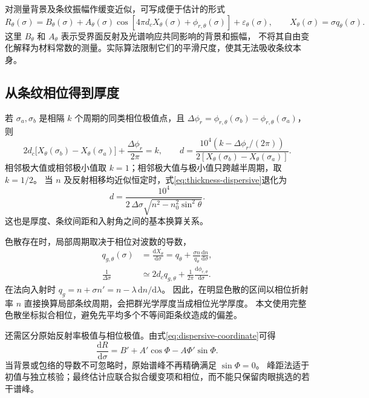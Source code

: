 对测量背景及条纹振幅作缓变近似，可写成便于估计的形式
\begin{equation}
 R_\theta(\sigma)=B_\theta(\sigma)+A_\theta(\sigma)
 \cos\!\left[4\pi d_cX_\theta(\sigma)+\phi_{r,\theta}(\sigma)\right]
 +\varepsilon_\theta(\sigma),\qquad
 X_\theta(\sigma)=\sigma q_\theta(\sigma).
 \label{eq:dispersive-coordinate}
\end{equation}
这里 $B_\theta$ 和 $A_\theta$ 表示受界面反射及光谱响应共同影响的背景和振幅，
不将其自由变化解释为材料常数的测量。实际算法限制它们的平滑尺度，使其无法吸收条纹本身。

\subsection{从条纹相位得到厚度}
若 $\sigma_a,\sigma_b$ 是相隔 $k$ 个周期的同类相位极值点，且
$\Delta\phi_r=\phi_{r,\theta}(\sigma_b)-\phi_{r,\theta}(\sigma_a)$，则
\begin{equation}
 2d_c\big[X_\theta(\sigma_b)-X_\theta(\sigma_a)\big]
 +\frac{\Delta\phi_r}{2\pi}=k,
 \qquad
 d=\frac{10^4\left(k-\Delta\phi_r/(2\pi)\right)}
 {2\left[X_\theta(\sigma_b)-X_\theta(\sigma_a)\right]}.
 \label{eq:thickness-dispersive}
\end{equation}
相邻极大值或相邻极小值取 $k=1$；相邻极大值与极小值只跨越半周期，取 $k=1/2$。
当 $n$ 及反射相移均近似恒定时，式\eqref{eq:thickness-dispersive}退化为
\begin{equation}
 d=\frac{10^4}{2\,\Delta\sigma\sqrt{n^2-n_0^2\sin^2\theta}}.
 \label{eq:thickness-constant-n}
\end{equation}
这也是厚度、条纹间距和入射角之间的基本换算关系。

色散存在时，局部周期取决于相位对波数的导数，
\begin{align}
 q_{g,\theta}(\sigma)&=\frac{\mathrm{d}X_\theta}{\mathrm{d}\sigma}
 =q_\theta+\frac{\sigma n}{q_\theta}\frac{\mathrm{d}n}{\mathrm{d}\sigma},\\
 \frac{1}{\Delta\sigma}&\simeq2d_cq_{g,\theta}
 +\frac{1}{2\pi}\frac{\mathrm{d}\phi_{r,\theta}}{\mathrm{d}\sigma}.
 \label{eq:group-optical-thickness}
\end{align}
在法向入射时 $q_g=n+\sigma n'=n-\lambda\,\mathrm{d}n/\mathrm{d}\lambda$。
因此，在明显色散的区间以相位折射率 $n$ 直接换算局部条纹周期，会把群光学厚度当成相位光学厚度。
本文使用完整色散坐标拟合相位，避免先平均多个不等间距条纹造成的偏差。

还需区分原始反射率极值与相位极值。由式\eqref{eq:dispersive-coordinate}可得
\begin{equation}
 \frac{\mathrm{d}R}{\mathrm{d}\sigma}
 =B'+A'\cos\Phi-A\Phi'\sin\Phi.
 \label{eq:envelope-peak-shift}
\end{equation}
当背景或包络的导数不可忽略时，原始谱峰不再精确满足 $\sin\Phi=0$。
峰距法适于初值与独立核验；最终估计应联合拟合缓变项和相位，而不能只保留肉眼挑选的若干谱峰。

